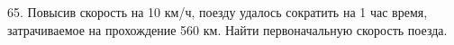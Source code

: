 65. Повысив скорость на 10 км/ч, поезду удалось сократить на 1 час время, затрачиваемое на прохождение 560 км. Найти первоначальную скорость поезда.\\
